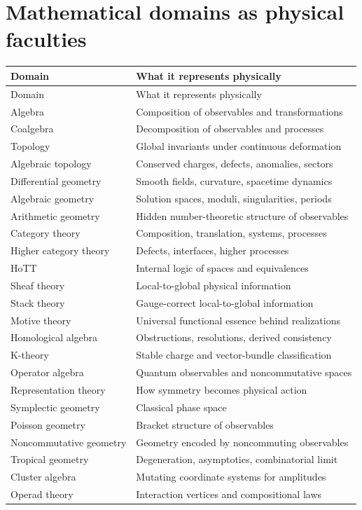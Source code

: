 \documentclass[11pt]{article}
\begin{document}
\section{Mathematical domains as physical faculties}
\begin{longtable}{@{}>{\raggedright\arraybackslash}p{}>{\raggedright\arraybackslash}p{}@{}}
\toprule
Domain & What it represents physically\\
\midrule
\endfirsthead
\toprule
Domain & What it represents physically\\
\midrule
\endhead
\bottomrule
\endfoot
Algebra & Composition of observables and transformations\\
Coalgebra & Decomposition of observables and processes\\
Topology & Global invariants under continuous deformation\\
Algebraic topology & Conserved charges, defects, anomalies, sectors\\
Differential geometry & Smooth fields, curvature, spacetime dynamics\\
Algebraic geometry & Solution spaces, moduli, singularities, periods\\
Arithmetic geometry & Hidden number-theoretic structure of observables\\
Category theory & Composition, translation, systems, processes\\
Higher category theory & Defects, interfaces, higher processes\\
HoTT & Internal logic of spaces and equivalences\\
Sheaf theory & Local-to-global physical information\\
Stack theory & Gauge-correct local-to-global information\\
Motive theory & Universal functional essence behind realizations\\
Homological algebra & Obstructions, resolutions, derived consistency\\
K-theory & Stable charge and vector-bundle classification\\
Operator algebra & Quantum observables and noncommutative spaces\\
Representation theory & How symmetry becomes physical action\\
Symplectic geometry & Classical phase space\\
Poisson geometry & Bracket structure of observables\\
Noncommutative geometry & Geometry encoded by noncommuting observables\\
Tropical geometry & Degeneration, asymptotics, combinatorial limit\\
Cluster algebra & Mutating coordinate systems for amplitudes\\
Operad theory & Interaction vertices and compositional laws\\
\end{longtable}
\normalsize
{}
\end{document}
